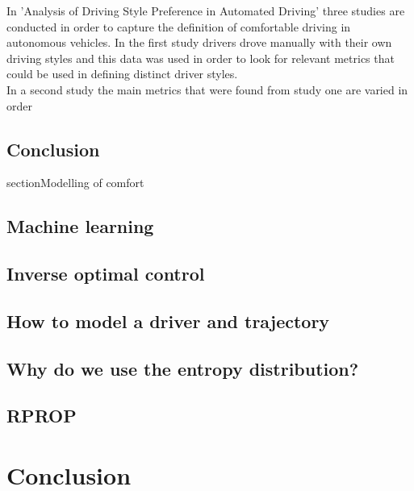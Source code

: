 In 'Analysis of Driving Style Preference in Automated Driving' \cite{Bellem} three studies are conducted in order to capture the definition of comfortable driving in autonomous vehicles.
In the first study drivers drove manually with their own driving styles and this data was used in order to look for relevant metrics that could be used in defining distinct driver styles.\\

In a second study the main metrics that were found from study one are varied in order 	 


\subsection{Conclusion}



section{Modelling of comfort}

\subsection{Machine learning}

\subsection{Inverse optimal control}


\subsection{How to model a driver and trajectory}


\subsection{Why do we use the entropy distribution?}


\subsection{RPROP}

\section{Conclusion}

 



















